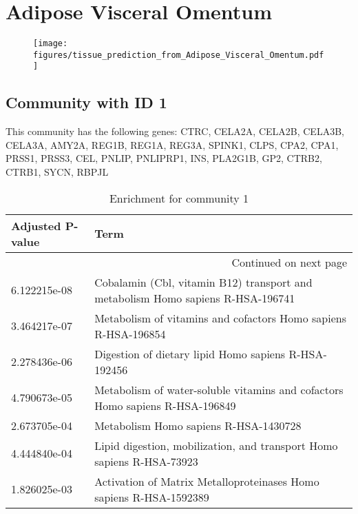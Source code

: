 
\section*{Adipose Visceral Omentum}
\begin{figure}[h!]
\centering
\texttt{[image: figures/tissue\_prediction\_from\_Adipose\_Visceral\_Omentum.pdf]}
\end{figure}



\subsection*{Community with ID 1}
This community has the following genes: CTRC, CELA2A, CELA2B, CELA3B, CELA3A, AMY2A, REG1B, REG1A, REG3A, SPINK1, CLPS, CPA2, CPA1, PRSS1, PRSS3, CEL, PNLIP, PNLIPRP1, INS, PLA2G1B, GP2, CTRB2, CTRB1, SYCN, RBPJL
\\
\begin{longtable}{p{2.4cm}p{14.5cm}}
\caption{Enrichment for community 1}\\
\toprule
Adjusted \newline P-value &                                                                             Term \\
\midrule
\endhead
\midrule
\multicolumn{2}{r}{{Continued on next page}} \\
\midrule
\endfoot

\bottomrule
\endlastfoot
             6.122215e-08 &  Cobalamin (Cbl, vitamin B12) transport and metabolism Homo sapiens R-HSA-196741 \\
             3.464217e-07 &                   Metabolism of vitamins and cofactors Homo sapiens R-HSA-196854 \\
             2.278436e-06 &                             Digestion of dietary lipid Homo sapiens R-HSA-192456 \\
             4.790673e-05 &     Metabolism of water-soluble vitamins and cofactors Homo sapiens R-HSA-196849 \\
             2.673705e-04 &                                            Metabolism Homo sapiens R-HSA-1430728 \\
             4.444840e-04 &            Lipid digestion, mobilization, and transport Homo sapiens R-HSA-73923 \\
             1.826025e-03 &               Activation of Matrix Metalloproteinases Homo sapiens R-HSA-1592389 \\
\end{longtable}


